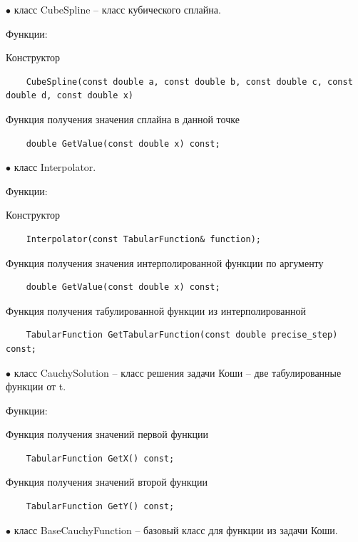 \documentclass{article}
\theoremstyle{definition}
\theoremstyle{remark}
\begin{document}
$\bullet$ класс CubeSpline -- класс кубического сплайна.

Функции:

Конструктор

\begin{lstlisting}
	CubeSpline(const double a, const double b, const double c, const double d, const double x)
\end{lstlisting}

Функция получения значения сплайна в данной точке
\begin{lstlisting}
	double GetValue(const double x) const;
\end{lstlisting}


$\bullet$ класс Interpolator.

Функции:

Конструктор

\begin{lstlisting}
	Interpolator(const TabularFunction& function);
\end{lstlisting}

Функция получения значения интерполированной функции по аргументу

\begin{lstlisting}
	double GetValue(const double x) const;
\end{lstlisting}

Функция получения табулированной функции из интерполированной

\begin{lstlisting}
	TabularFunction GetTabularFunction(const double precise_step) const;
\end{lstlisting}

$\bullet$ класс CauchySolution --  класс решения задачи Коши -- две табулированные функции от t.

Функции:

Функция получения значений первой функции

\begin{lstlisting}
	TabularFunction GetX() const;
\end{lstlisting}

Функция получения значений второй функции

\begin{lstlisting}
	TabularFunction GetY() const;

\end{lstlisting}

$\bullet$ класс BaseCauchyFunction -- базовый класс для функции из задачи Коши.
\end{document}
